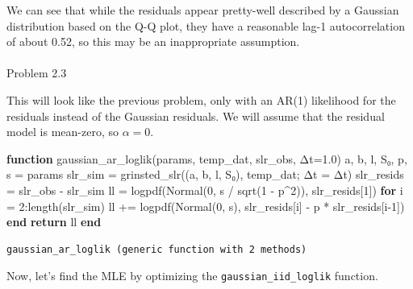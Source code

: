 \documentclass[
  letterpaper,
  DIV=11,
  numbers=noendperiod]{scrartcl}
\makeatletter
\let\oldparagraph\paragraph
\renewcommand{\paragraph}{
    \@ifstar
      \xxxParagraphStar
      \xxxParagraphNoStar
  }
\newcommand{\xxxParagraphStar}[1]{\oldparagraph*{#1}\mbox{}}
\newcommand{\xxxParagraphNoStar}[1]{\oldparagraph{#1}\mbox{}}
\newenvironment{Shaded}{\begin{snugshade}}{\end{snugshade}}
\newcommand{\ControlFlowTok}[1]{\textcolor[rgb]{0.00,0.23,0.31}{\textbf{#1}}}
\newcommand{\FloatTok}[1]{\textcolor[rgb]{0.68,0.00,0.00}{#1}}
\newcommand{\FunctionTok}[1]{\textcolor[rgb]{0.28,0.35,0.67}{#1}}
\newcommand{\KeywordTok}[1]{\textcolor[rgb]{0.00,0.23,0.31}{\textbf{#1}}}
\newcommand{\NormalTok}[1]{\textcolor[rgb]{0.00,0.23,0.31}{#1}}
\newcommand{\OperatorTok}[1]{\textcolor[rgb]{0.37,0.37,0.37}{#1}}
\makeatother
\begin{document}
We can see that while the residuals appear pretty-well described by a
Gaussian distribution based on the Q-Q plot, they have a reasonable
lag-1 autocorrelation of about 0.52, so this may be an inappropriate
assumption.

\paragraph{Problem 2.3}\label{problem-2.3}

This will look like the previous problem, only with an AR(1) likelihood
for the residuals instead of the Gaussian residuals. We will assume that
the residual model is mean-zero, so \(\alpha = 0\).

\begin{Shaded}
\begin{Highlighting}[]
\KeywordTok{function} \FunctionTok{gaussian\_ar\_loglik}\NormalTok{(params, temp\_dat, slr\_obs, Δt}\OperatorTok{=}\FloatTok{1.0}\NormalTok{)}
\NormalTok{    a, b, l, S₀, p, s }\OperatorTok{=}\NormalTok{ params }
\NormalTok{    slr\_sim }\OperatorTok{=} \FunctionTok{grinsted\_slr}\NormalTok{((a, b, l, S₀), temp\_dat; Δt }\OperatorTok{=}\NormalTok{ Δt)}
\NormalTok{    slr\_resids }\OperatorTok{=}\NormalTok{ slr\_obs }\OperatorTok{{-}}\NormalTok{ slr\_sim}
\NormalTok{    ll }\OperatorTok{=} \FunctionTok{logpdf}\NormalTok{(}\FunctionTok{Normal}\NormalTok{(}\FloatTok{0}\NormalTok{, s }\OperatorTok{/} \FunctionTok{sqrt}\NormalTok{(}\FloatTok{1} \OperatorTok{{-}}\NormalTok{ p}\OperatorTok{\^{}}\FloatTok{2}\NormalTok{)), slr\_resids[}\FloatTok{1}\NormalTok{])}
    \ControlFlowTok{for}\NormalTok{ i }\OperatorTok{=} \FloatTok{2}\OperatorTok{:}\FunctionTok{length}\NormalTok{(slr\_sim)}
\NormalTok{        ll }\OperatorTok{+=} \FunctionTok{logpdf}\NormalTok{(}\FunctionTok{Normal}\NormalTok{(}\FloatTok{0}\NormalTok{, s), slr\_resids[i] }\OperatorTok{{-}}\NormalTok{ p }\OperatorTok{*}\NormalTok{ slr\_resids[i}\OperatorTok{{-}}\FloatTok{1}\NormalTok{])}
    \ControlFlowTok{end}
    \ControlFlowTok{return}\NormalTok{ ll}
\KeywordTok{end}
\end{Highlighting}
\end{Shaded}

\begin{verbatim}
gaussian_ar_loglik (generic function with 2 methods)
\end{verbatim}

Now, let's find the MLE by optimizing the \texttt{gaussian\_iid\_loglik}
function.
\end{document}
